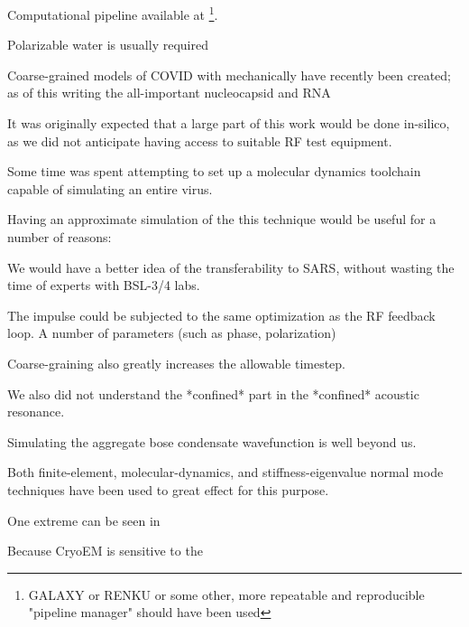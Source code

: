 \documentclass[paper.tex]{subfiles}
\begin{document}
Computational pipeline available at  \footnote{GALAXY or RENKU or some other, more repeatable and reproducible "pipeline manager" should have been used}. 

Polarizable water is usually required

Coarse-grained models of COVID with mechanically have recently been created; as of this writing the all-important nucleocapsid and RNA 



\printbibliography{}





It was originally expected that a large part of this work would be done in-silico, as we did not anticipate having access to suitable RF test equipment. 

Some time was spent attempting to set up a molecular dynamics toolchain capable of simulating an entire virus. 

Having an approximate simulation of the this technique would be useful for a number of reasons: 

We would have a better idea of the transferability to SARS, without wasting the time of experts with BSL-3/4 labs.

The impulse could be subjected to the same optimization as the RF feedback loop. A number of parameters (such as phase, polarization)



Coarse-graining also greatly increases the allowable timestep.

We also did not understand the *confined* part in the *confined* acoustic resonance.

Simulating the aggregate bose condensate wavefunction is well beyond us.


Both finite-element, molecular-dynamics, and stiffness-eigenvalue normal mode techniques have been used to great effect for this purpose. 








One extreme can be seen in 

Because CryoEM is sensitive to the 
\end{document}
